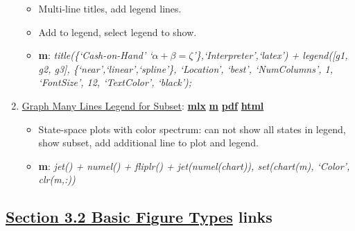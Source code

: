 \documentclass[
]{book}
\providecommand{\tightlist}{%
  \setlength{\itemsep}{0pt}\setlength{\parskip}{0pt}}
\begin{document}
\begin{enumerate}
  \begin{itemize}
  \tightlist
  \item
    Multi-line titles, add legend lines.
  \item
    Add to legend, select legend to show.
  \item
    \textbf{m}: \emph{title(\{`Cash-on-Hand' `\(\alpha + \beta = \zeta\)'\},`Interpreter',`latex') + legend({[}g1, g2, g3{]}, \{`near',`linear',`spline'\}, `Location', `best', `NumColumns', 1, `FontSize', 12, `TextColor', `black');}
  \end{itemize}
\item
  \href{https://fanwangecon.github.io/M4Econ/graph/tools/htmlpdfm/fs_legendsubset.html}{Graph Many Lines Legend for Subset}: \href{https://github.com/FanWangEcon/M4Econ/blob/master/graph/tools/fs_legendsubset.mlx}{\textbf{mlx}} \textbar{} \href{https://github.com/FanWangEcon/M4Econ/blob/master/graph/tools/htmlpdfm/fs_legendsubset.m}{\textbf{m}} \textbar{} \href{https://github.com/FanWangEcon/M4Econ/blob/master/graph/tools/htmlpdfm/fs_legendsubset.pdf}{\textbf{pdf}} \textbar{} \href{https://fanwangecon.github.io/M4Econ/graph/tools/htmlpdfm/fs_legendsubset.html}{\textbf{html}}

  \begin{itemize}
  \tightlist
  \item
    State-space plots with color spectrum: can not show all states in legend, show subset, add additional line to plot and legend.
  \item
    \textbf{m}: \emph{jet() + numel() + fliplr() + jet(numel(chart)), set(chart(m), `Color', clr(m,:))}
  \end{itemize}
\end{enumerate}

\hypertarget{section-3.2-basic-figure-typesbasic-figure-types-links}{%
\subsection{\texorpdfstring{\protect\hyperlink{basic-figure-types}{Section 3.2 Basic Figure Types} links}{Section 3.2 Basic Figure Types links}}\label{section-3.2-basic-figure-typesbasic-figure-types-links}}
\end{document}
